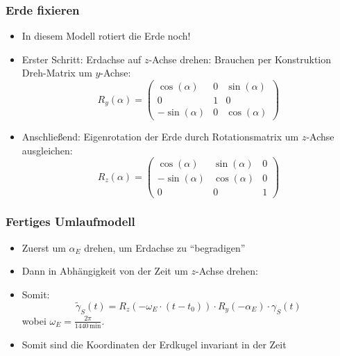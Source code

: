 \documentclass[aspectratio=43]{beamer}
\begin{document}
\begin{frame}
    \frametitle{Erde fixieren}
    \begin{itemize}
        \item In diesem Modell rotiert die Erde noch!
        \item Erster Schritt: Erdachse auf $z$-Achse drehen: Brauchen per Konstruktion
            Dreh-Matrix um $y$-Achse:
            \begin{equation*}
                R_y(\alpha) =
                \begin{pmatrix}
                    \cos(\alpha) & 0 & \sin(\alpha) \\
                    0 & 1 & 0 \\
                    -\sin(\alpha) & 0 & \cos(\alpha)
                \end{pmatrix}
            \end{equation*}
        \item Anschließend: Eigenrotation der Erde durch Rotationsmatrix um $z$-Achse
            ausgleichen:
            \begin{equation*}
                R_z(\alpha) =
                \begin{pmatrix}
                    \cos(\alpha) & \sin(\alpha) & 0 \\
                    -\sin(\alpha) & \cos(\alpha) & 0 \\
                    0 & 0 & 1
                \end{pmatrix}
            \end{equation*}
    \end{itemize}
\end{frame}

\begin{frame}
    \frametitle{Fertiges Umlaufmodell}
    \begin{itemize}
        \item Zuerst um $\alpha_E$ drehen, um Erdachse zu \enquote{begradigen}
        \item Dann in Abhängigkeit von der Zeit um $z$-Achse drehen:
        \item Somit:
            \begin{equation*}
                \tilde \gamma_S(t) = R_z(-\omega_E\cdot (t - t_0)) \cdot R_y(-\alpha_E) \cdot
                \gamma_S(t)
            \end{equation*}
            wobei $\omega_E=\frac{2\pi}{1440\,\mathrm{min}}$.
        \item Somit sind die Koordinaten der Erdkugel invariant in der Zeit
    \end{itemize}
\end{frame}
\end{document}
